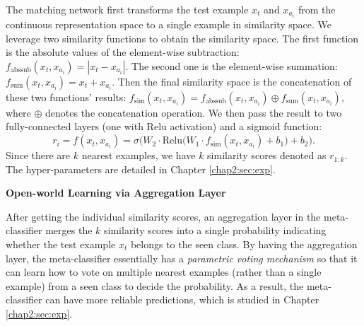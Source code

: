 The matching network first transforms the test example $x_t$ and $x_{a_{i}}$ from the continuous representation space to a single example in similarity space.
We leverage two similarity functions to obtain the similarity space.
The first function is the absolute values of the element-wise subtraction:
$f_\text{abssub}(x_t, x_{a_{i}})=|x_t - x_{a_{i}}|$.
The second one is the element-wise summation:
$f_\text{sum}(x_t, x_{a_{i}})=x_t + x_{a_{i}}$.
Then the final similarity space is the concatenation of these two functions' results:
$f_\text{sim}(x_t, x_{a_{i}})=f_\text{abssub}(x_t, x_{a_{i}}) \oplus f_\text{sum}(x_t, x_{a_{i}})$, where $\oplus$ denotes the concatenation operation.
We then pass the result to two fully-connected layers (one with Relu activation) and a sigmoid function: 
\begin{equation}
\label{chap2:eq:r}
r_i=f(x_t, x_{a_i} )=\sigma\Big(W_2\cdot\text{Relu}\big(W_1\cdot f_\text{sim}(x_t, x_{a_i} ) +b_1\big)+b_2\Big).
\end{equation}
Since there are $k$ nearest examples, we have $k$ similarity scores denoted as $r_{1:k}$.
The hyper-parameters are detailed in Chapter \ref{chap2:sec:exp}.

\textbf{Open-world Learning via Aggregation Layer}
\label{chap2:sec:agg}

After getting the individual similarity scores, an aggregation layer in the meta-classifier merges the $k$ similarity scores into a single probability indicating whether the test example $x_t$ belongs to the seen class.
By having the aggregation layer, the meta-classifier essentially has a \textit{parametric voting mechanism} so that it can learn how to vote on multiple nearest examples (rather than a single example) from a seen class to decide the probability.
As a result, the meta-classifier can have more reliable predictions, which is studied in Chapter \ref{chap2:sec:exp}.

